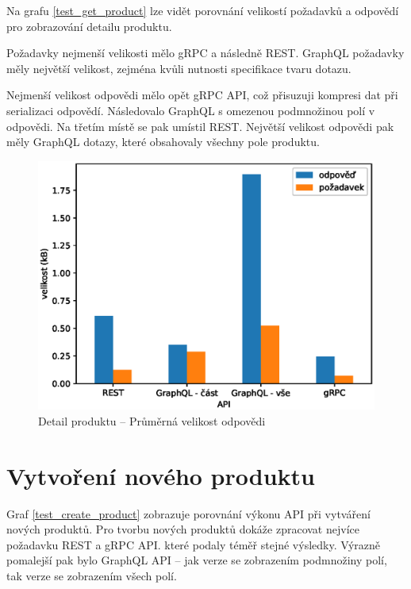 \documentclass[thesis=M,czech]{FITthesis}[2019/12/23]
\begin{document}
Na grafu \ref{test_get_product} lze vidět porovnání velikostí požadavků a odpovědí pro zobrazování detailu produktu.

Požadavky nejmenší velikosti mělo gRPC a následně REST. GraphQL požadavky měly největší velikost, zejména kvůli nutnosti specifikace tvaru dotazu. 

Nejmenší velikost odpovědi mělo opět gRPC API, což přisuzuji kompresi dat při serializaci odpovědí. Následovalo GraphQL s omezenou podmnožinou polí v odpovědi. Na třetím místě se pak umístil REST. Největší velikost odpovědi pak měly GraphQL dotazy, které obsahovaly všechny pole produktu.

\begin{figure}[]
  \includegraphics[width=\linewidth]{img/req-size.eps}
  \caption{Detail produktu -- Průměrná velikost odpovědi}
\label{test_get_product_size}
\end{figure}

\section{Vytvoření nového produktu}
Graf \ref{test_create_product} zobrazuje porovnání výkonu API při vytváření nových produktů. Pro tvorbu nových produktů dokáže zpracovat nejvíce požadavku REST a gRPC API. které podaly téměř stejné výsledky. Výrazně pomalejší pak bylo GraphQL API -- jak verze se zobrazením podmnožiny polí, tak verze se zobrazením všech polí.
\end{document}
